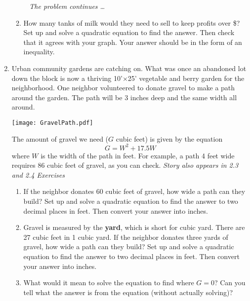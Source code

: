 \begin{enumerate}
\begin{enumerate}
\newpage %
~\hspace{-.5in} \emph{The problem continues \ldots}

\item How many tanks of milk would they need to sell to keep profits over \$?  Set up and solve a quadratic equation to find the answer.  Then check that it agrees with your graph.   Your answer should be in the form of an inequality. \vfill
\end{enumerate}

\newpage %

 \item Urban community gardens are catching on.  What was once an abandoned lot down the block is now a thriving 10'$\times$25' vegetable and berry garden for the neighborhood. One neighbor  volunteered to donate  gravel to make a path around the garden.  The path will be 3 inches deep and the same width all around.   
\begin{center}
\scalebox {.4} {\texttt{[image: GravelPath.pdf]}}
\end{center}
The amount of gravel we need ($G$ cubic feet) is given by the equation  $$G = W^2 + 17.5W$$
where $W$ is the width of the path in feet.  For example, a path 4 feet wide requires 86 cubic feet of gravel, as you can check.
\hfill \emph{Story also appears in 2.3 and 2.4 Exercises}
\begin{enumerate}
\item  If the neighbor donates 60 cubic feet of gravel, how wide a path can they build?  Set up and solve a quadratic equation to find the answer to two decimal places in feet. Then convert your answer into inches. \vfill
\item Gravel is measured by the \textbf{yard}, which is short for cubic yard.  There are 27 cubic feet in 1 cubic yard.  If the neighbor donates three yards of gravel, how wide a path can they build? Set up and solve a quadratic equation to find the answer to two decimal places in feet. Then convert your answer into inches. \vfill
\item What would it mean to solve the equation to find where $G=0$?  Can you tell what the answer is from the equation (without actually solving)? \bigskip
\end{enumerate}

\end{enumerate}


